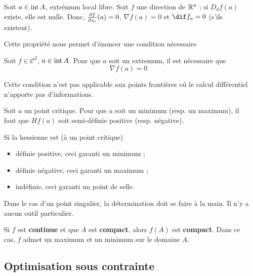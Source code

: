 \begin{myprop}
	Soit $a \in \operatorname{int} A$, extrémum local libre. Soit $f$ une direction de $\mathbb{R}^n$ ; si $D_df(a)$ existe, elle est nulle. Donc, $\frac{\partial f}{\partial x_i}(a) = 0$, $\nabla f(a) = 0$ et $\dif f_a = 0$ (s'ils existent).
\end{myprop}
Cette propriété nous permet d'énoncer une condition nécessaire
\begin{myprop}
	Soit $f \in \mathcal{C}^2$, $a \in \operatorname{int} A$. Pour que $a$ soit un extremum, il est nécessaire que
	\[ \nabla f(a) = 0 \]
\end{myprop}

\begin{myrem}
	Cette condition n'est pas applicable aux points frontières où le calcul différentiel n'apporte pas d'informations.
\end{myrem}

\begin{myprop}
	Soit $a$ un point critique. Pour que $a$ soit un minimum (resp. un maximum),
    il faut que $Hf(a)$ soit semi-définie positive (resp. négative).
\end{myprop}

\begin{myprop}
	Si la hessienne est (à un point critique)
	\begin{itemize}
		\item définie positive, ceci garanti un minimum ;
		\item définie négative, ceci garanti un maximum ;
		\item indéfinie, ceci garanti un point de selle.
	\end{itemize}
\end{myprop}

\begin{myprop}
	Dans le cas d'un point singulier, la détermination doit se faire à la main. Il n'y a aucun outil particulier.
\end{myprop}

\begin{mytheo}
	Si $f$ est \textbf{continue} et que $A$ est \textbf{compact}, alors $f(A)$ est \textbf{compact}. Dans ce cas, $f$ admet un maximum et un minimum sur le domaine $A$.
\end{mytheo}

\subsection{Optimisation sous contrainte}

